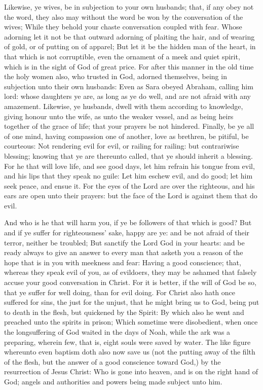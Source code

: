  Likewise, ye wives, be in subjection to your own husbands;
that, if any obey not the word, they also may without the word be won by
the conversation of the wives;  While they behold your
chaste conversation coupled with fear.  Whose adorning let
it not be that outward adorning of plaiting the hair, and of wearing of
gold, or of putting on of apparel;  But let it be the hidden
man of the heart, in that which is not corruptible, even the ornament of
a meek and quiet spirit, which is in the sight of God of great price.
 For after this manner in the old time the holy women also,
who trusted in God, adorned themselves, being in subjection unto their
own husbands:  Even as Sara obeyed Abraham, calling him
lord: whose daughters ye are, as long as ye do well, and are not afraid
with any amazement.  Likewise, ye husbands, dwell with them
according to knowledge, giving honour unto the wife, as unto the weaker
vessel, and as being heirs together of the grace of life; that your
prayers be not hindered.  Finally, be ye all of one mind,
having compassion one of another, love as brethren, be pitiful, be
courteous:  Not rendering evil for evil, or railing for
railing: but contrariwise blessing; knowing that ye are thereunto
called, that ye should inherit a blessing.  For he that
will love life, and see good days, let him refrain his tongue from evil,
and his lips that they speak no guile:  Let him eschew
evil, and do good; let him seek peace, and ensue it.  For
the eyes of the Lord are over the righteous, and his ears are open unto
their prayers: but the face of the Lord is against them that do evil.

 And who is he that will harm you, if ye be followers of
that which is good?  But and if ye suffer for
righteousness' sake, happy are ye: and be not afraid of their terror,
neither be troubled;  But sanctify the Lord God in your
hearts: and be ready always to give an answer to every man that asketh
you a reason of the hope that is in you with meekness and fear:
 Having a good conscience; that, whereas they speak evil of
you, as of evildoers, they may be ashamed that falsely accuse your good
conversation in Christ.  For it is better, if the will of
God be so, that ye suffer for well doing, than for evil doing.
 For Christ also hath once suffered for sins, the just for
the unjust, that he might bring us to God, being put to death in the
flesh, but quickened by the Spirit:  By which also he went
and preached unto the spirits in prison;  Which sometime
were disobedient, when once the longsuffering of God waited in the days
of Noah, while the ark was a preparing, wherein few, that is, eight
souls were saved by water.  The like figure whereunto even
baptism doth also now save us (not the putting away of the filth of the
flesh, but the answer of a good conscience toward God,) by the
resurrection of Jesus Christ:  Who is gone into heaven, and
is on the right hand of God; angels and authorities and powers being
made subject unto him.

